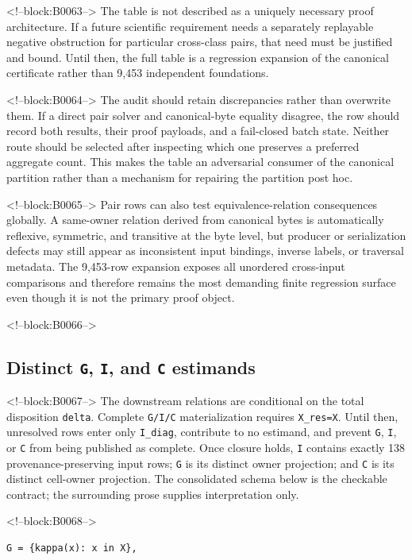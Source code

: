 \documentclass[11pt]{article}
\begin{document}
<!--block:B0063-->
The table is not described as a uniquely necessary proof architecture.
If a future scientific requirement needs a separately replayable
negative obstruction for particular cross-class pairs, that need must be
justified and bound. Until then, the full table is a regression
expansion of the canonical certificate rather than 9,453 independent
foundations.

<!--block:B0064-->
The audit should retain discrepancies rather than overwrite them. If a
direct pair solver and canonical-byte equality disagree, the row should
record both results, their proof payloads, and a fail-closed batch state.
Neither route should be selected after inspecting which one preserves a
preferred aggregate count. This makes the table an adversarial consumer
of the canonical partition rather than a mechanism for repairing the
partition post hoc.

<!--block:B0065-->
Pair rows can also test equivalence-relation consequences globally. A
same-owner relation derived from canonical bytes is automatically
reflexive, symmetric, and transitive at the byte level, but producer or
serialization defects may still appear as inconsistent input bindings,
inverse labels, or traversal metadata. The 9,453-row expansion exposes
all unordered cross-input comparisons and therefore remains the most
demanding finite regression surface even though it is not the primary
proof object.

<!--block:B0066-->
\hypertarget{44-distinct-g-i-and-c-estimands}{%
\subsection{\texorpdfstring{Distinct \texttt{G}, \texttt{I}, and
\texttt{C}
estimands}{Distinct G, I, and C estimands}}\label{44-distinct-g-i-and-c-estimands}}

<!--block:B0067-->
The downstream relations are conditional on the total disposition
\texttt{delta}.  Complete \texttt{G/I/C} materialization requires
\texttt{X\_res=X}.  Until then, unresolved rows enter only
\texttt{I\_diag}, contribute to no estimand, and prevent \texttt{G},
\texttt{I}, or \texttt{C} from being published as complete.  Once closure holds,
\texttt{I} contains exactly 138 provenance-preserving input rows;
\texttt{G} is its distinct owner projection; and \texttt{C} is its distinct
cell-owner projection.  The consolidated schema below is the checkable contract;
the surrounding prose supplies interpretation only.

<!--block:B0068-->
\begin{verbatim}
G = {kappa(x): x in X},
\end{verbatim}
\end{document}
